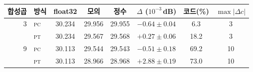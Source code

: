 \setlength{\tabcolsep}{4pt}
\begin{tabular}{rlcccccc}
\toprule
합성곱 & 방식 & float32 & 모의 & 정수 & $\Delta$ ($10^{-3}$\,dB) & 코드(\%) & $\max|\Delta c|$ \\
\midrule
3 & \textsc{pc} & 30.234 & 29.956 & 29.955 & $-0.64\pm0.04$ & 6.3 & 3 \\
 & \textsc{pt} & 30.234 & 29.567 & 29.568 & $+0.27\pm0.06$ & 18.2 & 3 \\
\midrule
9 & \textsc{pc} & 30.113 & 29.544 & 29.543 & $-0.51\pm0.18$ & 69.2 & 10 \\
 & \textsc{pt} & 30.113 & 28.966 & 28.968 & $+2.88\pm0.19$ & 73.0 & 10 \\
\bottomrule
\end{tabular}
